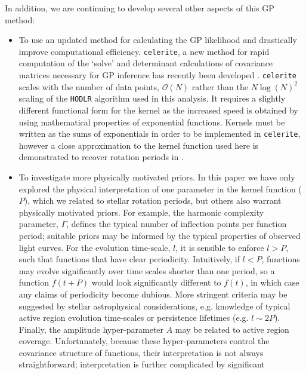 \documentclass[a4paper,fleqn,usenatbib,useAMS]{mnras}
\newcommand{\response}[1]{{#1}}
\begin{document}
In addition, we are continuing to develop several other aspects of this GP
method:
\begin{itemize}
    \item{\response{To use an updated method for calculating the GP likelihood and
    drastically improve computational efficiency.
        {\tt celerite}, a new method for rapid computation of the `solve' and
        determinant calculations of covariance matrices necessary for GP
        inference has recently been developed \citep{Foremanmackey2017}.
        {\tt celerite} scales with the number of data points, $\mathcal{O}(N)$
        rather than the $N\log(N)^2$ scaling of the {\tt HODLR} algorithm used
        in this analysis.
        It requires a slightly different functional form for the kernel as the
        increased speed is obtained by using mathematical properties of
        exponential functions.
        Kernels must be written as the sums of exponentials in order to be
        implemented in {\tt celerite}, however a close approximation to the
        kernel function used here is demonstrated to recover rotation periods
        in \citet{Foremanmackey2017}.}}
\item{To investigate more physically motivated priors.
        In this paper we have only explored the physical interpretation of one
        parameter in the kernel function ($P$), which we related to stellar
        rotation periods, but others also warrant physically motivated priors.
        For example, the harmonic complexity parameter, $\Gamma$, defines the
        typical number of inflection points per function period; suitable
        priors may be informed by the typical properties of observed light
        curves.
        For the evolution time-scale, $l$,  it is sensible to enforce $l > P$,
        such that functions that have clear periodicity.
        Intuitively, if $l < P$, functions may evolve significantly over time
        scales shorter than one period, so a function $f(t+P)$ would look
        significantly different to $f(t)$, in which case any claims of
        periodicity become dubious.
        More stringent criteria may be suggested by stellar astrophysical
        considerations, e.g. knowledge of typical active region evolution
        time-scales or persistence lifetimes (e.g. $l\sim2P$).
        Finally, the amplitude hyper-parameter $A$ may be related to active
        region coverage.
        Unfortunately, because these hyper-parameters control the covariance
        structure of functions, their interpretation is not always
        straightforward; interpretation is further complicated by significant
}
\end{itemize}
\end{document}
